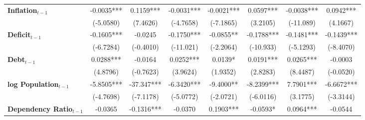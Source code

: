 \begin{center}
\begin{tabular}{lccccccc}
\textbf{Inflation$_{t-1}$}      &      -0.0035***      &          0.1159***          &          -0.0031***          &              -0.0021***             &            0.0597***             &          -0.0038***         &           0.0942***            \\
\textbf{ }                         &      (-5.0580)       &           (7.4626)          &          (-4.7658)           &              (-7.1865)              &             (3.2105)             &          (-11.089)          &            (4.1667)            \\
\textbf{Deficit$_{t-1}$}             &      -0.1605***      &           -0.0245           &          -0.1750***          &              -0.0855**              &            -0.1788***            &          -0.1481***         &           -0.1439***           \\
\textbf{ }                         &      (-6.7284)       &          (-0.4010)          &          (-11.021)           &              (-2.2064)              &            (-10.933)             &          (-5.1293)          &           (-8.4070)            \\
\textbf{Debt$_{t-1}$}                &      0.0288***       &           -0.0164           &          0.0252***           &               0.0139*               &            0.0191***             &          0.0265***          &            -0.0003             \\
\textbf{ }                         &       (4.8796)       &          (-0.7623)          &           (3.9624)           &               (1.9352)              &             (2.8283)             &           (8.4487)          &           (-0.0520)            \\
\textbf{log Population$_{t-1}$}      &      -5.8505***      &          -37.347***         &          -6.3420***          &              -9.4000**              &            -8.2399***            &          7.7901***          &           -6.6672***           \\
\textbf{ }                         &      (-4.7698)       &          (-7.1178)          &          (-5.0772)           &              (-2.0721)              &            (-6.0116)             &           (3.1775)          &           (-3.3144)            \\
\textbf{Dependency Ratio$_{t-1}$}   &       -0.0365        &          -0.1316***         &           -0.0370            &              0.1903***              &             -0.0593*             &          0.0964***          &            -0.0544             \\

\end{tabular}
\end{center}
